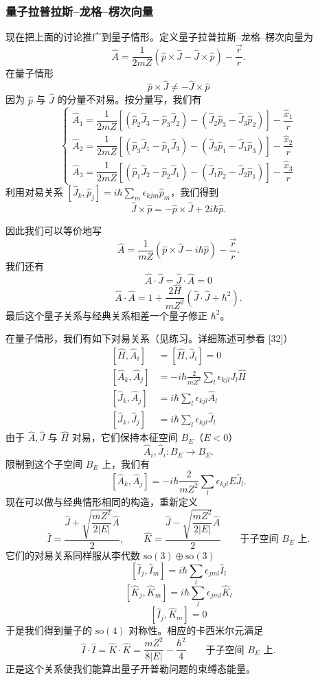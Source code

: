 \subsubsection*{量子拉普拉斯–龙格–楞次向量}

现在把上面的讨论推广到量子情形。定义量子拉普拉斯–龙格–楞次向量为
\[
  \hat A=\frac{1}{2mZ}\left(\hat p\times\hat J-\hat J\times\hat p\right)-\frac{\vec r}{r}.
\]
在量子情形
\[
  \hat p\times\hat J\ne-\hat J\times\hat p
\]
因为 \(\hat p\) 与 \(\hat J\) 的分量不对易。按分量写，我们有
\[
  \begin{cases}
    \hat A_1=\dfrac{1}{2mZ}\left[\left(\hat p_2\hat J_3-\hat p_3\hat J_2\right)
      -\left(\hat J_2\hat p_3-\hat J_3\hat p_2\right)\right]-\dfrac{\hat x_1}{r}\\[10pt]
    \hat A_2=\dfrac{1}{2mZ}\left[\left(\hat p_3\hat J_1-\hat p_1\hat J_3\right)
      -\left(\hat J_3\hat p_1-\hat J_1\hat p_3\right)\right]-\dfrac{\hat x_2}{r}\\[10pt]
    \hat A_3=\dfrac{1}{2mZ}\left[\left(\hat p_1\hat J_2-\hat p_2\hat J_1\right)
      -\left(\hat J_1\hat p_2-\hat J_2\hat p_1\right)\right]-\dfrac{\hat x_3}{r}
  \end{cases}
\]
利用对易关系 \([\hat J_k,\hat p_j]=i\hbar\sum_m\epsilon_{kjm}\hat p_m\)，我们得到
\[
  \hat J\times\hat p=-\hat p\times\hat J+2i\hbar\hat p.
\]

因此我们可以等价地写
\[
  \hat A=\frac{1}{mZ}\left(\hat p\times\hat J-i\hbar\hat p\right)-\frac{\vec r}{r}.
\]
我们还有
\[
  \hat A\cdot\hat J=\hat J\cdot\hat A=0
\]
\[
  \hat A\cdot\hat A=1+\frac{2\hat H}{mZ^2}\left(\hat J\cdot\hat J+\hbar^2\right).
\]
最后这个量子关系与经典关系相差一个量子修正 \(\hbar^2\)。

在量子情形，我们有如下对易关系（见练习。详细陈述可参看 [32]）
\[
  \begin{aligned}
    [\hat H,\hat A_i]&=[\hat H,\hat J_i]=0\\
    [\hat A_k,\hat A_j]&=-i\hbar\frac{2}{mZ^2}\sum_l\epsilon_{kjl}\hat J_l\hat H\\
    [\hat J_k,\hat A_j]&=i\hbar\sum_l\epsilon_{kjl}\hat A_l\\
    [\hat J_k,\hat J_j]&=i\hbar\sum_l\epsilon_{kjl}\hat J_l
  \end{aligned}
\]
由于 \(\hat A,\hat J\) 与 \(\hat H\) 对易，它们保持本征空间 \(B_E\)（\(E<0\)）
\[
  \hat A_i,\hat J_i:B_E\longrightarrow B_E.
\]
限制到这个子空间 \(B_E\) 上，我们有
\[
  [\hat A_k,\hat A_j]=-i\hbar\frac{2}{mZ^2}\sum_l\epsilon_{kjl}E\hat J_l.
\]
现在可以做与经典情形相同的构造，重新定义
\[
  \hat I=\frac{\hat J+\sqrt{\dfrac{mZ^2}{2|E|}}\hat A}{2},
  \qquad
  \hat K=\frac{\hat J-\sqrt{\dfrac{mZ^2}{2|E|}}\hat A}{2}
  \qquad \text{于子空间 } B_E \text{ 上}.
\]
它们的对易关系同样服从李代数 \(\mathrm{so}(3)\oplus\mathrm{so}(3)\)
\[
  [\hat I_j,\hat I_m]=i\hbar\sum_l\epsilon_{jml}\hat I_l
\]
\[
  [\hat K_j,\hat K_m]=i\hbar\sum_l\epsilon_{jml}\hat K_l
\]
\[
  [\hat I_j,\hat K_m]=0
\]
于是我们得到量子的 \(\mathrm{so}(4)\) 对称性。相应的卡西米尔元满足
\[
  \hat I\cdot\hat I=\hat K\cdot\hat K=\frac{mZ^2}{8|E|}-\frac{\hbar^2}{4}
  \qquad \text{于子空间 } B_E \text{ 上}.
\]
正是这个关系使我们能算出量子开普勒问题的束缚态能量。

